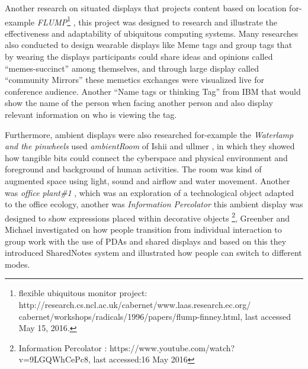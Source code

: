 Another research on situated displays that projects content based on location for-example  \emph{FLUMP}\footnote{flexible ubiquitous monitor project: http://research.cs.ncl.ac.uk/cabernet/www.laas.research.ec.org/ \\ cabernet/workshops/radicals/1996/papers/flump-finney.html, last accessed May 15, 2016.} \cite{flump}, this project was designed to research and illustrate the effectiveness and adaptability of ubiquitous computing systems. Many researches also conducted to design wearable displays like Meme tags and group tags \cite{meme-tags} that by wearing the displays participants could share ideas and opinions called “memes-succinct” among themselves, and through large display called “community Mirrors” these memetics exchanges were visualized live for conference audience. Another “Name tags or thinking Tag” from IBM \cite{ibmtags} that would show the name of the person when facing another person and also display relevant information on who is viewing the tag.

Furthermore, ambient displays were also researched for-example the \emph{Waterlamp and the pinwheels} used \emph{ambientRoom} of Ishii and ullmer \cite{ambient}, in which they showed how tangible bits could connect the cyberspace and physical environment and foreground and background of human activities. The room was kind of augmented space using light, sound and airflow and water movement. Another was \emph{office plant\#1} \cite{office_plant}, which was an exploration of a technological object adapted to the office ecology, another was \emph{Information Percolator} \cite{information_precolator}  this ambient display was designed to show expressions placed within decorative objects \footnote{Information Percolator : https://www.youtube.com/watch?v=9LGQWhCePc8, last accessed:16 May 2016},  Greenber and Michael \cite{shared_notes} investigated on how people transition from individual interaction to group work with the use of PDAs and shared displays and based on this they introduced SharedNotes system and illustrated how people can switch to different modes.

